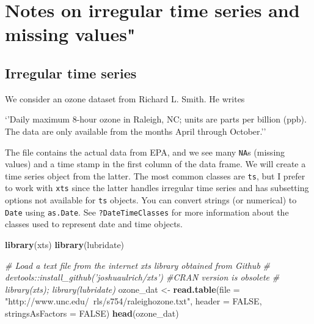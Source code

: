 \documentclass[]{book}
\newenvironment{Shaded}{\begin{snugshade}}{\end{snugshade}}
\newcommand{\KeywordTok}[1]{\textcolor[rgb]{0.13,0.29,0.53}{\textbf{#1}}}
\newcommand{\DataTypeTok}[1]{\textcolor[rgb]{0.13,0.29,0.53}{#1}}
\newcommand{\StringTok}[1]{\textcolor[rgb]{0.31,0.60,0.02}{#1}}
\newcommand{\CommentTok}[1]{\textcolor[rgb]{0.56,0.35,0.01}{\textit{#1}}}
\newcommand{\OtherTok}[1]{\textcolor[rgb]{0.56,0.35,0.01}{#1}}
\newcommand{\NormalTok}[1]{#1}
\begin{document}
\chapter{Notes on irregular time series and missing
values"}\label{notes-on-irregular-time-series-and-missing-values}

\section{Irregular time series}\label{irregular-time-series}

We consider an ozone dataset from Richard L. Smith. He writes

`'Daily maximum 8-hour ozone in Raleigh, NC; units are parts per billion
(ppb). The data are only available from the months April through
October.''

The file contains the actual data from EPA, and we see many \texttt{NA}s
(missing values) and a time stamp in the first column of the data frame.
We will create a time series object from the latter. The most common
classes are \texttt{ts}, but I prefer to work with \texttt{xts} since
the latter handles irregular time series and has subsetting options not
available for \texttt{ts} objects. You can convert strings (or
numerical) to \texttt{Date} using \texttt{as.Date}. See
\texttt{?DateTimeClasses} for more information about the classes used to
represent date and time objects.

\begin{Shaded}
\begin{Highlighting}[]
\KeywordTok{library}\NormalTok{(xts)}
\KeywordTok{library}\NormalTok{(lubridate)}
\end{Highlighting}
\end{Shaded}

\begin{Shaded}
\begin{Highlighting}[]
\CommentTok{# Load a text file from the internet xts library obtained from Github}
\CommentTok{# devtools::install_github('joshuaulrich/xts') #CRAN version is obsolete}
\CommentTok{# library(xts); library(lubridate)}
\NormalTok{ozone_dat <-}\StringTok{ }\KeywordTok{read.table}\NormalTok{(}\DataTypeTok{file =} \StringTok{"http://www.unc.edu/~rls/s754/raleighozone.txt"}\NormalTok{, }
    \DataTypeTok{header =} \OtherTok{FALSE}\NormalTok{, }\DataTypeTok{stringsAsFactors =} \OtherTok{FALSE}\NormalTok{)}
\KeywordTok{head}\NormalTok{(ozone_dat)}
\end{Highlighting}
\end{Shaded}
\end{document}
